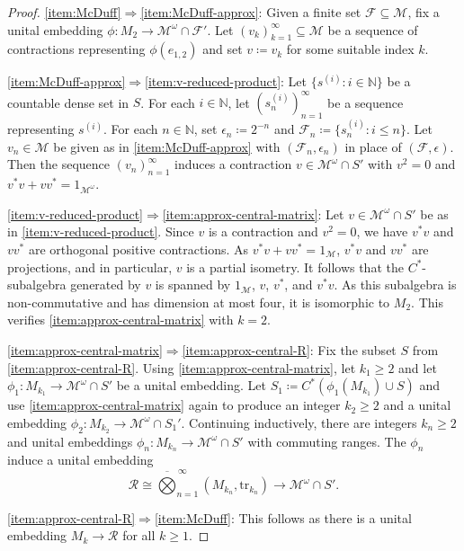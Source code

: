 \documentclass[a4paper,11pt]{amsart}
\theoremstyle{definition}
\numberwithin{equation}{section}
\numberwithin{theorem}{section}
\newcommand{\R}{\mathcal R}
\newcommand{\N}{\mathbb N}
\newcommand{\M}{\mathcal{M}}
\begin{document}
\begin{proof} \ref{item:McDuff}$\Rightarrow$\ref{item:McDuff-approx}:  Given a finite set $\mathcal F \subseteq \M$, fix a unital embedding $\phi\colon M_2 \rightarrow \M^\omega \cap \mathcal F'$.  Let $(v_k)_{k=1}^\infty \subseteq \M$ be a sequence of contractions representing $\phi(e_{1, 2})$ and set $v \coloneqq v_k$ for some suitable index $k$.

\ref{item:McDuff-approx}$\Rightarrow$\ref{item:v-reduced-product}:
Let $\{s^{(i)}:i\in\N\}$ be a countable dense set in $S$. For each $i\in\N$, let $(s^{(i)}_n)_{n=1}^\infty$ be a sequence representing $s^{(i)}$.
For each $n \in \N$, set $\epsilon_n \coloneqq 2^{-n}$ and $\mathcal{F}_n \coloneqq \{ s^{(i)}_n: i \leq n\}$. Let $v_n \in \M$ be given as in \ref{item:McDuff-approx} with $(\mathcal{F}_n, \epsilon_n)$ in place of $(\mathcal F, \epsilon)$.  Then the sequence $(v_n)_{n=1}^\infty$ induces a contraction $v \in \M^\omega \cap S'$ with $v^2 = 0$ and $v^*v + vv^* = 1_{\M^\omega}$.

\ref{item:v-reduced-product}$\Rightarrow$\ref{item:approx-central-matrix}:
Let $v \in \M^\omega \cap S'$ be as in \ref{item:v-reduced-product}. 
Since $v$ is a contraction and $v^2 = 0$, we have $v^*v$ and $vv^*$ are orthogonal positive contractions.  As $v^*v + vv^* = 1_\mathcal M$, $v^*v$ and $vv^*$ are projections, and in particular, $v$ is a partial isometry.  It follows that the $C^*$-subalgebra generated by $v$ is spanned by $1_\mathcal M$, $v$, $v^*$, and $v^*v$.  As this subalgebra is non-commutative and has dimension at most four, it is isomorphic to $M_2$.  This verifies \ref{item:approx-central-matrix} with $k = 2$.

\ref{item:approx-central-matrix}$\Rightarrow$\ref{item:approx-central-R}: 
Fix the subset $S$ from \ref{item:approx-central-R}. Using \ref{item:approx-central-matrix}, let $k_1\geq 2$ and let $\phi_1 \colon M_{k_1} \rightarrow \M^\omega \cap S'$ be a unital embedding.  Let $S_1 \coloneqq C^*(\phi_1(M_{k_1}) \cup S)$ and use \ref{item:approx-central-matrix} again to produce an integer $k_2 \geq 2$ and a unital embedding $\phi_2 \colon M_{k_2} \rightarrow \M^\omega \cap S_1'$.  Continuing inductively, there are integers $k_n \geq 2$ and unital embeddings $\phi_n \colon M_{k_n} \rightarrow \M^\omega \cap S'$ with commuting ranges.  The $\phi_n$ induce a unital embedding
\begin{equation}
	 \R \cong \overline{\bigotimes}_{n=1}^{\,\infty} (M_{k_n}, \mathrm{tr}_{k_n}) \rightarrow \M^\omega \cap S'.
\end{equation}

\ref{item:approx-central-R}$\Rightarrow$\ref{item:McDuff}: This follows as there is a unital embedding $M_k \rightarrow \R$ for all $k \geq 1$.
\end{proof}
\end{document}

